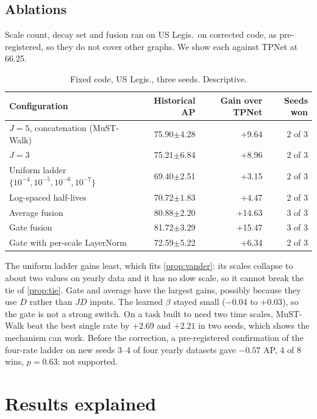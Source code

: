 \documentclass[11pt,a4paper]{article}
\theoremstyle{plain}
\theoremstyle{definition}
\begin{document}
\subsection{Ablations}
Scale count, decay set and fusion ran on US Legis.\ on corrected code, as pre-registered, so they do not cover other graphs. We show each against TPNet at 66.25.
\begin{table}[H]\centering\small
\begin{tabular}{p{6.6cm}rrr}
\toprule
Configuration & Historical AP & Gain over TPNet & Seeds won\\
\midrule
$J=5$, concatenation (MuST-Walk) & 75.90$\pm$4.28 & +9.64 & 2 of 3\\
$J=3$ & 75.21$\pm$6.84 & +8.96 & 2 of 3\\
Uniform ladder $\{10^{-4},10^{-5},10^{-6},10^{-7}\}$ & 69.40$\pm$2.51 & +3.15 & 2 of 3\\
Log-spaced half-lives & 70.72$\pm$1.83 & +4.47 & 2 of 3\\
Average fusion & 80.88$\pm$2.20 & +14.63 & 3 of 3\\
Gate fusion & 81.72$\pm$3.29 & +15.47 & 3 of 3\\
Gate with per-scale LayerNorm & 72.59$\pm$5.22 & +6.34 & 2 of 3\\
\bottomrule
\end{tabular}
\caption{Fixed code, US Legis., three seeds. Descriptive.}\label{tab:abl}
\end{table}
The uniform ladder gains least, which fits \cref{prop:vander}: its scales collapse to about two values on yearly data and it has no slow scale, so it cannot break the tie of \cref{prop:tie}. Gate and average have the largest gains, possibly because they use $D$ rather than $JD$ inputs. The learned $\beta$ stayed small ($-0.04$ to $+0.03$), so the gate is not a strong switch. On a task built to need two time scales, MuST-Walk beat the best single rate by $+2.69$ and $+2.21$ in two seeds, which shows the mechanism can work. Before the correction, a pre-registered confirmation of the four-rate ladder on new seeds 3--4 of four yearly datasets gave $-0.57$ AP, 4 of 8 wins, $p=0.63$: not supported.

\section{Results explained}\label{sec:why}
\end{document}

